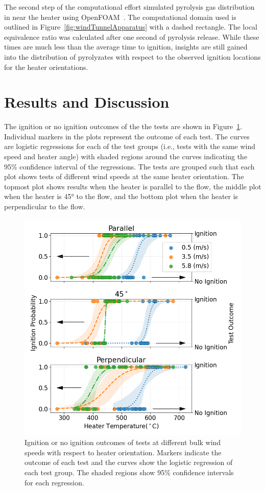    The second step of the computational effort simulated pyrolysis gas distribution in near the heater using OpenFOAM~\cite{Foundation2020}. The computational domain used is outlined in Figure~\ref{fig:windTunnelApparatus} with a dashed rectangle. The local equivalence ratio was calculated after one second of pyrolysis release. While these times are much less than the average time to ignition, insights are still gained into the distribution of pyrolyzates with respect to the observed ignition locations for the heater orientations.
    
\section{Results and Discussion}
    The ignition or no ignition outcomes of the the tests are shown in Figure~\ref{fig:heaterAngle}. Individual markers in the plots represent the outcome of each test. The curves are logistic regressions for each of the test groups (i.e., tests with the same wind speed and heater angle) with shaded regions around the curves indicating the 95\% confidence interval of the regressions. The tests are grouped such that each plot shows tests of different wind speeds at the same heater orientation. The topmost plot shows results when the heater is parallel to the flow, the middle plot when the heater is 45\si{\degree} to the flow, and the bottom plot when the heater is perpendicular to the flow. 
        \begin{figure}[hpbt]
            \centering
            \includegraphics[width=0.5\columnwidth]{Figures/heat_angle_hist_names.png}
            \caption{Ignition or no ignition outcomes of tests at different bulk wind speeds with respect to heater orientation. Markers indicate the outcome of each test and the curves show the logistic regression of each test group. The shaded regions show 95\% confidence intervals for each regression.}
            \label{fig:heaterAngle}
        \end{figure}
